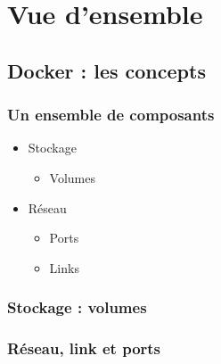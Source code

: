   \section[Docker]{Vue d'ensemble}

  \subsection[Docker]{Docker : les concepts}

  \begin{frame}
    \frametitle{Un ensemble de composants}
    \begin{itemize}
      \item Stockage\pause
      \begin{itemize}
        \item Volumes \pause
      \end{itemize}
      \item Réseau \pause
      \begin{itemize}
          \item Ports \pause
          \item Links \pause
      \end{itemize}
    \end{itemize}
  \end{frame}

  \begin{frame}
    \frametitle{Stockage : volumes}
  \end{frame}

  \begin{frame}
    \frametitle{Réseau, link et ports}
  \end{frame}
